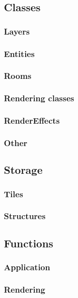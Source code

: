 \documentclass{article}
\begin{document}
        \subsection{Classes}
            \subsubsection{Layers}
            \subsubsection{Entities}
            \subsubsection{Rooms}
            \subsubsection{Rendering classes}
            \subsubsection{RenderEffects}
            \subsubsection{Other}
        \subsection{Storage}
            \subsubsection{Tiles}
            \subsubsection{Structures}
        \subsection{Functions}
            \subsubsection{Application}
            \subsubsection{Rendering}
\end{document}
